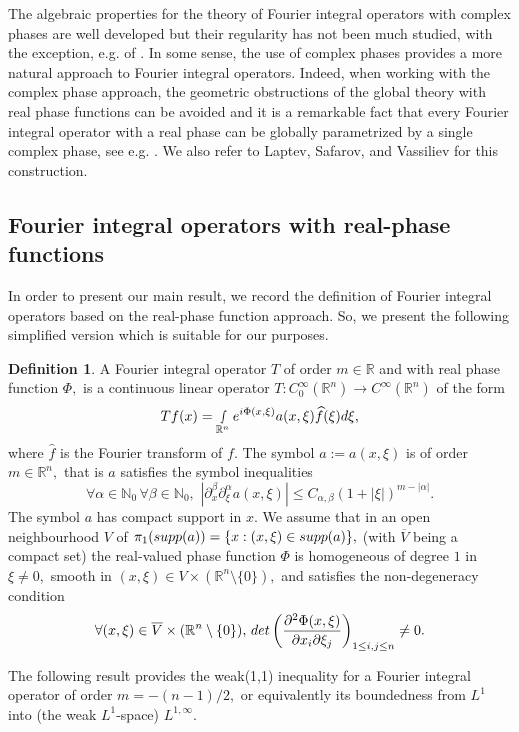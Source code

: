 \documentclass[12pt, reqno]{amsart}
\theoremstyle{definition}
\newtheorem{definition}[theorem]{Definition}
\theoremstyle{remark}
\numberwithin{equation}{section}
\begin{document}
The algebraic properties for the theory of Fourier integral operators with complex phases are well developed but their regularity has
not been much studied, with the exception, e.g. of \cite{Ruzhansky:CWI-book}. In some sense, the use of complex phases provides a more natural
approach to Fourier integral operators. Indeed,  when working with the complex phase approach, the geometric obstructions of the global theory with real phase functions can be avoided and it is a remarkable fact that every Fourier integral operator with a real phase can be globally parametrized
by a single complex phase, see e.g.  \cite{Ruzhansky:CWI-book}. We also refer to Laptev, Safarov, and Vassiliev \cite{Laptev:Safarov:Vassiliev} for this construction.

\subsection{Fourier integral operators with real-phase functions}
In order to present our main result, we record the definition of Fourier integral operators based on the real-phase function approach. So, we present the following simplified version which is suitable for our purposes. 
\begin{definition} A Fourier integral operator $T$  of order $m\in \mathbb{R}$ and with real phase function $\Phi,$  is a continuous linear operator $T:C^\infty_0(\mathbb{R}^n)\rightarrow C^\infty(\mathbb{R}^n) $  of  the form
\begin{equation}\label{FIO:Quantisation}
    Tf(x)=\smallint\limits_{\mathbb{R}^n}e^{i\Phi(x,\xi)}a(x,\xi)\widehat{f}(\xi)d\xi,
\end{equation} where $\widehat{f}$ is the Fourier transform of $f.$ The symbol $a:=a(x,\xi)$ is of order $m\in \mathbb{R}^n,$ that is $a$ satisfies the symbol inequalities
\begin{equation}
    \forall\alpha\in \mathbb{N}_0\,\forall\beta \in \mathbb{N}_0,\,\,|\partial_{x}^\beta\partial_\xi^\alpha a(x,\xi)|\leq C_{\alpha,\beta}(1+|\xi|)^{m-|\alpha|}.
\end{equation} The symbol $a$ has compact support in $x.$ We assume that in an open neighbourhood $V$ of $\pi_1(\textnormal{supp}(a))=\{x:(x,\xi)\in \textnormal{supp}(a)\},$ (with $\overline{V}$ being a compact set) the real-valued phase function $\Phi$ is homogeneous of degree $1$ in $\xi\neq 0,$ smooth in $(x,\xi)\in {V}\times (\mathbb{R}^n\setminus \{0\}),$  and satisfies the non-degeneracy condition
\begin{equation}
  \forall (x,\xi)\in \overline{V}\times (\mathbb{R}^n\setminus \{0\}),\,  \textnormal{det}\left(\frac{\partial^{2}\Phi(x,\xi)}{\partial {x_i}\partial {\xi_j}}\right)_{1\leq i,j\leq n }\neq 0.
\end{equation}   
\end{definition} The following result provides the weak(1,1) inequality for a Fourier integral operator of order $m=-(n-1)/2,$ or equivalently its boundedness from $L^{1}$ into (the weak $L^1$-space) $L^{1,\infty}.$
  
\end{document}
